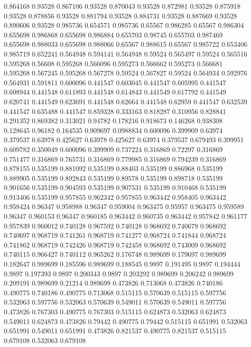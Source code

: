 0.864168 0.93528
0.867106 0.93528
0.870043 0.93528
0.872981 0.93528
0.875918 0.93528
0.878856 0.93528
0.881794 0.93528
0.884731 0.93528
0.887669 0.93528
0.890606 0.93528
0.985736 0.654571
0.985736 0.65567
0.986285 0.65567
0.986304 0.655698
0.986868 0.655698
0.986884 0.655703
0.98745 0.655703
0.987469 0.655698
0.988033 0.655698
0.988066 0.65567
0.988615 0.65567
0.985722 0.653406
0.985719 0.652241
0.564948 0.594141
0.564948 0.59524
0.565497 0.59524
0.565516 0.595268
0.56608 0.595268
0.566096 0.595273
0.566662 0.595273
0.566681 0.595268
0.567245 0.595268
0.567278 0.59524
0.567827 0.59524
0.564934 0.592976
0.564931 0.591811
0.600096 0.441547
0.603045 0.441547
0.605995 0.441547
0.608944 0.441548
0.611893 0.441548
0.614843 0.441549
0.617792 0.441549
0.620741 0.441549
0.623691 0.441548
0.62664 0.441548
0.62959 0.441547
0.632539 0.441547
0.635488 0.441547
0.859328 0.333163
0.818287 0.310956
0.828841 0.291352
0.869382 0.313021
0.94782 0.178216
0.918673 0.146268
0.938308 0.128645
0.96182 0.164535
0.909697 0.0988834
0.600096 0.399909
0.63974 0.379537
0.63978 0.425627
0.63978 0.425627
0.63974 0.379537
0.679493 0.399951
0.609782 0.350049
0.600096 0.399909
0.737224 0.316869
0.72297 0.316869
0.751477 0.316869
0.765731 0.316869
0.779985 0.316869
0.794239 0.316869
0.878155 0.535199
0.881092 0.535199
0.88403 0.535199
0.886968 0.535199
0.889905 0.535199
0.892843 0.535199
0.89578 0.535199
0.898718 0.535199
0.901656 0.535199
0.904593 0.535199
0.907531 0.535199
0.910468 0.535199
0.913406 0.535199
0.957855 0.962342
0.957855 0.963442
0.958405 0.963442
0.958424 0.96347
0.958988 0.96347
0.959004 0.963475
0.95957 0.963475
0.959589 0.96347
0.960153 0.96347
0.960185 0.963442
0.960735 0.963442
0.957842 0.961177
0.957839 0.960012
0.740128 0.967592
0.740128 0.968692
0.740679 0.968692
0.740697 0.968719
0.741261 0.968719
0.741277 0.968724
0.741844 0.968724
0.741862 0.968719
0.742426 0.968719
0.742458 0.968692
0.743009 0.968692
0.740115 0.966427
0.740112 0.965262
0.176748 0.989699
0.179697 0.989699
0.182647 0.989699
0.185596 0.989699
0.188545 0.9897
0.191495 0.9897
0.194444 0.9897
0.197393 0.9897
0.200343 0.9897
0.203292 0.989699
0.206242 0.989699
0.209191 0.989699
0.21214 0.989699
0.473826 0.713068
0.473826 0.740186
0.490775 0.740186
0.490775 0.713068
0.515115 0.570639
0.515115 0.597756
0.532063 0.597756
0.532063 0.570639
0.549011 0.570639
0.549011 0.597756
0.473826 0.767303
0.490775 0.767303
0.515115 0.624873
0.532063 0.624873
0.549011 0.624873
0.473826 0.79442
0.490775 0.79442
0.515115 0.651991
0.532063 0.651991
0.549011 0.651991
0.473826 0.821537
0.490775 0.821537
0.515115 0.679108
0.532063 0.679108
